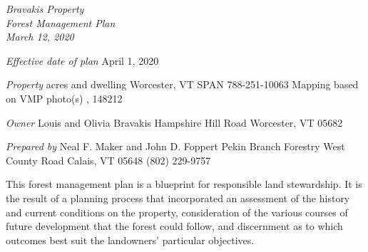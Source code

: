 \documentclass[]{tufte-handout}
\date{}
\begin{document}
\thispagestyle{empty}

\noindent\LARGE \emph{Bravakis Property}\\
\noindent\Large \emph{Forest Management Plan}\\
\noindent\Large \emph{March 12, 2020}

\normalsize 

\begin{marginfigure}
\hspace{2pt}\newline\vspace{80pt}
\noindent \textit{\large Effective date of plan}  
\newline\indent April 1, 2020  
\end{marginfigure}

\begin{marginfigure}
\noindent \textit{\large Property}   
\newline{} acres and dwelling   
\newline\indent Worcester, VT  
\newline\indent SPAN 788-251-10063  
\newline\indent Mapping based on VMP photo(s)  
\newline{}, 148212  
\end{marginfigure}

\begin{marginfigure}
\noindent \textit{\large Owner}
\newline\indent Louis and Olivia Bravakis  
\newline{} Hampshire Hill Road
\indent 
\newline\indent Worcester, VT 05682  
\end{marginfigure}

\begin{marginfigure}
\noindent \textit{\large Prepared by} 
\newline\indent Neal F. Maker and John D. Foppert  
\newline\indent Pekin Branch Forestry  
\newline{} West County Road  
\newline\indent Calais, VT 05648  
\newline\indent (802) 229-9757  
\vspace{100pt}\end{marginfigure}

\vspace{30pt} \indent This forest management plan is a blueprint for
responsible land stewardship. It is the result of a planning process
that incorporated an assessment of the history and current conditions on
the property, consideration of the various courses of future development
that the forest could follow, and discernment as to which outcomes best
suit the landowners' particular objectives.
\end{document}
